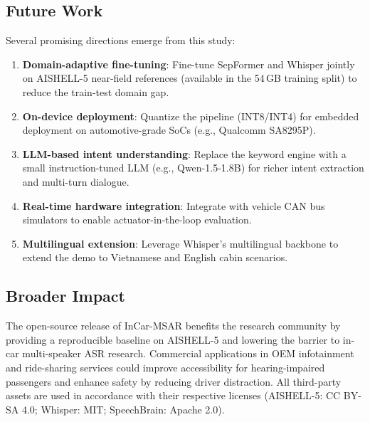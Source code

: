 \subsection{Future Work}

Several promising directions emerge from this study:

\begin{enumerate}
    \item \textbf{Domain-adaptive fine-tuning}: Fine-tune SepFormer and
    Whisper jointly on AISHELL-5 near-field references (available in the
    54\,GB training split) to reduce the train-test domain gap.
    \item \textbf{On-device deployment}: Quantize the pipeline (INT8/INT4)
    for embedded deployment on automotive-grade SoCs (e.g., Qualcomm SA8295P).
    \item \textbf{LLM-based intent understanding}: Replace the keyword engine
    with a small instruction-tuned LLM (e.g., Qwen-1.5-1.8B) for richer
    intent extraction and multi-turn dialogue.
    \item \textbf{Real-time hardware integration}: Integrate with
    vehicle CAN bus simulators to enable actuator-in-the-loop evaluation.
    \item \textbf{Multilingual extension}: Leverage Whisper's multilingual
    backbone to extend the demo to Vietnamese and English cabin scenarios.
\end{enumerate}

\subsection{Broader Impact}

The open-source release of InCar-MSAR benefits the research community by
providing a reproducible baseline on AISHELL-5 and lowering the barrier to
in-car multi-speaker ASR research. Commercial applications in OEM
infotainment and ride-sharing services could improve accessibility for
hearing-impaired passengers and enhance safety by reducing driver distraction.
All third-party assets are used in accordance with their respective licenses
(AISHELL-5: CC BY-SA 4.0; Whisper: MIT; SpeechBrain: Apache 2.0).
